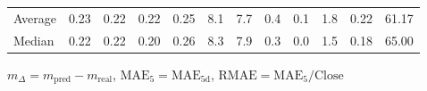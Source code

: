 \begin{threeparttable}
{\begin{tabular}{lrrrrrrrrrrr}
Average &          0.23 &          0.22 &          0.22 &        0.25 &                 8.1 &                 7.7 &        0.4 &                 0.1 &              1.8 &            0.22 &                  61.17 \\
 Median &          0.22 &          0.22 &          0.20 &        0.26 &                 8.3 &                 7.9 &        0.3 &                 0.0 &              1.5 &            0.18 &                  65.00 \\
\bottomrule
\end{tabular}
}
\begin{tablenotes}\footnotesize
\item $m_\Delta=m_{\text{pred}}-m_{\text{real}}$,
$\mathrm{MAE}_5=\mathrm{MAE}_{5\text{d}}$,
$\mathrm{RMAE}=\mathrm{MAE}_5/\text{Close}$
\end{tablenotes}
\end{threeparttable}
\endgroup

